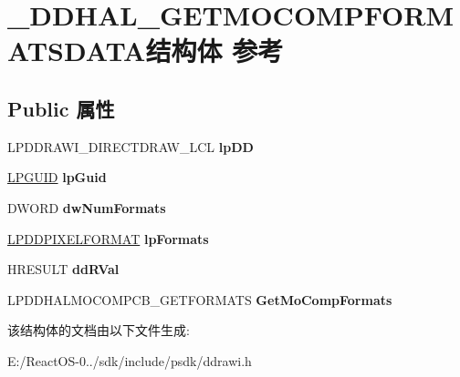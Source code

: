 \hypertarget{struct___d_d_h_a_l___g_e_t_m_o_c_o_m_p_f_o_r_m_a_t_s_d_a_t_a}{}\section{\+\_\+\+D\+D\+H\+A\+L\+\_\+\+G\+E\+T\+M\+O\+C\+O\+M\+P\+F\+O\+R\+M\+A\+T\+S\+D\+A\+T\+A结构体 参考}
\label{struct___d_d_h_a_l___g_e_t_m_o_c_o_m_p_f_o_r_m_a_t_s_d_a_t_a}
\subsection*{Public 属性}
\begin{DoxyCompactItemize}
\item 
\mbox{\label{struct___d_d_h_a_l___g_e_t_m_o_c_o_m_p_f_o_r_m_a_t_s_d_a_t_a_a9f3f2712cfef2411293463e260951d9c}} 
L\+P\+D\+D\+R\+A\+W\+I\+\_\+\+D\+I\+R\+E\+C\+T\+D\+R\+A\+W\+\_\+\+L\+CL {\bfseries lp\+DD}
\item 
\mbox{\label{struct___d_d_h_a_l___g_e_t_m_o_c_o_m_p_f_o_r_m_a_t_s_d_a_t_a_ab0f12013568bf9f3a9cc86aa598e9a00}} 
\hyperlink{interface_g_u_i_d}{L\+P\+G\+U\+ID} {\bfseries lp\+Guid}
\item 
\mbox{\label{struct___d_d_h_a_l___g_e_t_m_o_c_o_m_p_f_o_r_m_a_t_s_d_a_t_a_a0a7b037a67e373a2fd1f1dc54cf329e8}} 
D\+W\+O\+RD {\bfseries dw\+Num\+Formats}
\item 
\mbox{\label{struct___d_d_h_a_l___g_e_t_m_o_c_o_m_p_f_o_r_m_a_t_s_d_a_t_a_ac3a227e39eb61bceae605773c80b00ba}} 
\hyperlink{interfacevoid}{L\+P\+D\+D\+P\+I\+X\+E\+L\+F\+O\+R\+M\+AT} {\bfseries lp\+Formats}
\item 
\mbox{\label{struct___d_d_h_a_l___g_e_t_m_o_c_o_m_p_f_o_r_m_a_t_s_d_a_t_a_adc4c961fa081bee7e30b9b3fce0d1ef5}} 
H\+R\+E\+S\+U\+LT {\bfseries dd\+R\+Val}
\item 
\mbox{\label{struct___d_d_h_a_l___g_e_t_m_o_c_o_m_p_f_o_r_m_a_t_s_d_a_t_a_a4f30513351bad77ea3e49a43cbc8af8e}} 
L\+P\+D\+D\+H\+A\+L\+M\+O\+C\+O\+M\+P\+C\+B\+\_\+\+G\+E\+T\+F\+O\+R\+M\+A\+TS {\bfseries Get\+Mo\+Comp\+Formats}
\end{DoxyCompactItemize}


该结构体的文档由以下文件生成\+:\begin{DoxyCompactItemize}
\item 
E\+:/\+React\+O\+S-\/0../sdk/include/psdk/ddrawi.\+h\end{DoxyCompactItemize}
